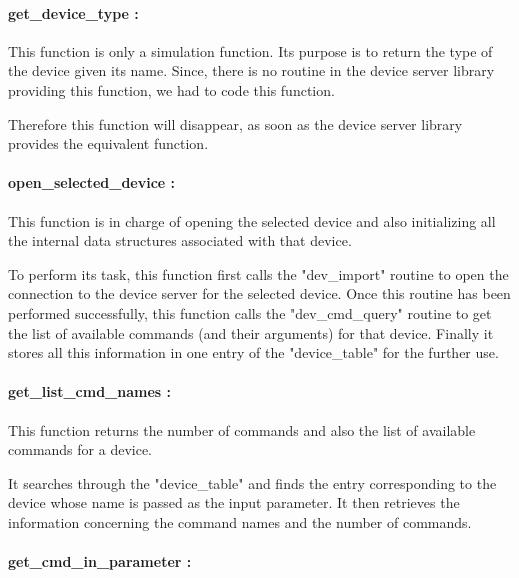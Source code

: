 
\paragraph{get\_device\_type : }

This function is only a simulation function. Its purpose is to return the
type of the device given its name. Since, there is no routine in the device
server library providing this function, we had to code this function.

Therefore this function will disappear, as soon as the device server library
provides the equivalent function. 


\paragraph{open\_selected\_device : }

This function is in charge of opening the selected device and also
initializing all the internal data structures associated with that device.

To perform its task, this function first calls the "dev\_import" routine to
open the connection to the device server for the selected device. Once this
routine has been performed successfully, this function calls the
"dev\_cmd\_query" routine to get the list of available commands (and their
arguments) for that device. Finally it stores all this information in one
entry of the "device\_table" for the further use.


\paragraph{get\_list\_cmd\_names : }

This function returns the number of commands and also the list of available
commands for a device.

It searches through the "device\_table" and finds the entry corresponding to the
device whose name is passed as the input parameter. It then retrieves the
information concerning the command names and the number of commands.


\paragraph{get\_cmd\_in\_parameter : }

